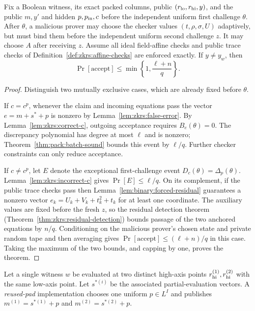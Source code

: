 \begin{theorem}\label{thm:zkrs:false-sound}
Fix a Boolean witness, its exact packed
columns, public $(r_{\rm lo},r_{\rm hi},y)$,
and the public $m,y'$ and hidden
$p,p_{\rm in},c$ before the independent
uniform first challenge $\theta$.
After $\theta$, a malicious prover may
choose the checker values $(t,\rho,\sigma,U)$
adaptively, but must bind them before the
independent uniform second challenge $z$.
It may choose $A$ after receiving $z$.
Assume all ideal field-affine checks and
public trace checks of
Definition~\ref{def:zkrs:affine-checks}
are enforced exactly.
If $y\ne y_w$, then
\[
 \boxed{
 \Pr[\mathrm{accept}]
 \leq\min\left\{1,\frac{\ell+n}{q}\right\}.
 }
\]
\end{theorem}
\begin{proof}
Distinguish two mutually exclusive cases,
which are already fixed before $\theta$.

If $c=c^p$, whenever the claim and
incoming equations pass the vector
$e=m+s^*+p$ is nonzero by
Lemma~\ref{lem:zkrs:false-error}.
By Lemma~\ref{lem:zkrs:correct-c},
outgoing acceptance requires
$B_e(\theta)=0$. The discrepancy
polynomial has degree at most $\ell$
and is nonzero; Theorem~\ref{thm:pack:batch-sound}
bounds this event by $\ell/q$.
Further checker constraints can only
reduce acceptance.

If $c\ne c^p$, let $E$ denote the
exceptional first-challenge event
$D_c(\theta)=\Delta_p(\theta)$.
Lemma~\ref{lem:zkrs:incorrect-c}
gives $\Pr[E]\leq\ell/q$.
On its complement, if the public
trace checks pass then
Lemma~\ref{lem:binary:forced-residual}
guarantees a nonzero vector
$e_k=U_k+V_k+t_k^2+t_k$
for at least one coordinate.
The auxiliary values are fixed
before the fresh $z$, so the residual
detection theorem
(Theorem~\ref{thm:zkrs:residual-detection})
bounds passage of the two anchored
equations by $n/q$.
Conditioning on the malicious prover's
chosen state and private random tape
and then averaging gives
$\Pr[\mathrm{accept}]\leq(\ell+n)/q$
in this case.
Taking the maximum of the two bounds,
and capping by one, proves the theorem.
\end{proof}

\begin{definition}\label{def:zkrs:reuse-game}
Let a single witness $w$ be evaluated
at two distinct high-axis points
$r_{\rm hi}^{(1)},r_{\rm hi}^{(2)}$
with the same low-axis point.
Let $s^{*(i)}$ be the associated
partial-evaluation vectors.
A \emph{reused-pad} implementation
chooses one uniform $p\in L^I$
and publishes
$m^{(1)}=s^{*(1)}+p$ and
$m^{(2)}=s^{*(2)}+p$.
\end{definition}

